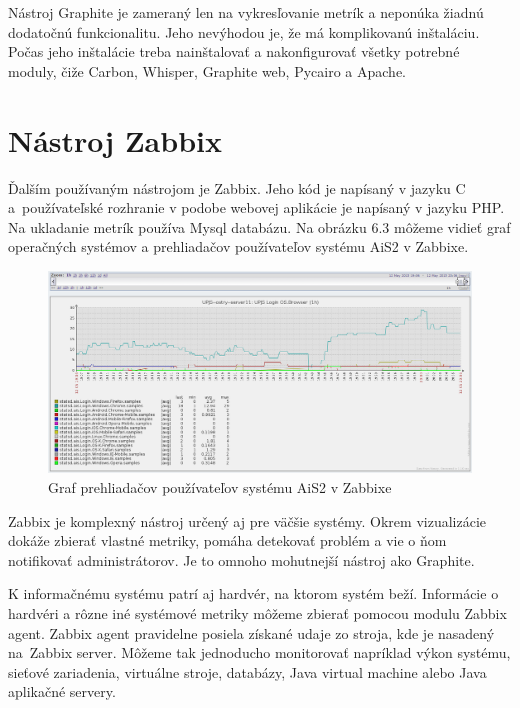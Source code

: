 \documentclass[a4paper, upjsfrontpage, disablespecwarning, thesismargins, thesislinespacing]{rnthesis}
\begin{document}
Nástroj Graphite je zameraný len na vykresľovanie metrík a neponúka žiadnú dodatočnú funkcionalitu.
Jeho nevýhodou je, že má komplikovanú inštaláciu.
Počas jeho inštalácie treba nainštalovať a nakonfigurovať všetky potrebné moduly, čiže Carbon, Whisper, Graphite web, Pycairo a Apache.


\section{Nástroj Zabbix}

Ďalším používaným nástrojom je Zabbix.
Jeho kód je napísaný v jazyku C a~používateľské rozhranie v podobe webovej aplikácie je napísaný v jazyku PHP.
Na ukladanie metrík používa Mysql databázu.
Na obrázku 6.3 môžeme vidieť graf operačných systémov a prehliadačov používateľov systému AiS2 v Zabbixe.

\begin{figure}
	\begin{center}
		\includegraphics[scale=0.41]{zabbix1.png}
	\end{center}
	\caption{Graf prehliadačov používateľov systému AiS2 v Zabbixe}
\end{figure}

Zabbix je komplexný nástroj určený aj pre väčšie systémy.
Okrem vizualizácie dokáže zbierať vlastné metriky, pomáha detekovať problém a vie o ňom notifikovať administrátorov.
Je to omnoho mohutnejší nástroj ako Graphite.

K informačnému systému patrí aj hardvér, na ktorom systém beží.
Informácie o hardvéri a rôzne iné systémové metriky môžeme zbierať pomocou modulu Zabbix agent.
Zabbix agent pravidelne posiela získané udaje zo stroja, kde je nasadený na~Zab\-bix server.
Môžeme tak jednoducho monitorovať napríklad výkon systému, sieťové zariadenia, virtuálne stroje, databázy, Java virtual machine alebo Java aplikačné servery.
\end{document}

